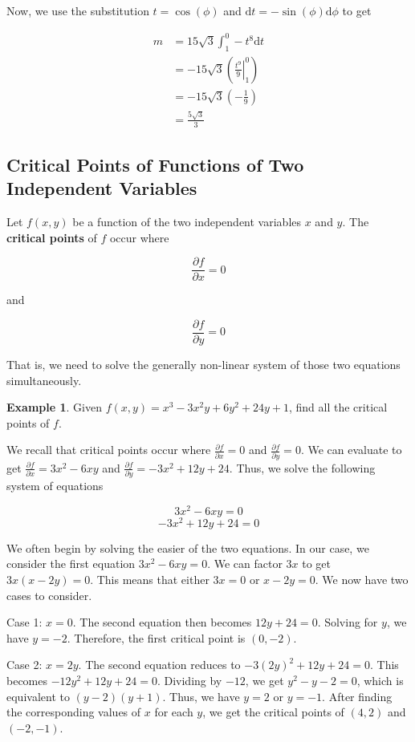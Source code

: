 \documentclass[11pt]{article}
\theoremstyle{plain} %
\theoremstyle{definition}
\theoremstyle{example}
\newtheorem*{example}{Example}
\theoremstyle{remark}
\begin{document}
Now, we use the substitution $t=\cos(\phi)$ and $\mathrm d t = - \sin(\phi)\mathrm d \phi$ to get

\begin{align*}
	m &= 15\sqrt{3}\int_1^0-t^8\mathrm d t\\
	&= -15\sqrt{3}\left(\left.\frac{t^9}{9}\right|_1^0\right)\\
	&= -15\sqrt{3}\left(-\frac{1}{9}\right)\\
	&= \frac{5\sqrt{3}}{3}
\end{align*}

\subsection{Critical Points of Functions of Two Independent Variables}

Let $f(x,y)$ be a function of the two independent variables $x$ and $y$. The \textbf{critical points} of $f$ occur where

$$\frac{\partial f}{\partial x} = 0$$ 

and

$$\frac{\partial f}{\partial y} = 0$$

That is, we need to solve the generally non-linear system of those two equations simultaneously. 

\begin{example}
Given $f(x,y) = x^3-3x^2y+6y^2+24y+1$, find all the critical points of $f$. 
\end{example}

We recall that critical points occur where $\frac{\partial f}{\partial x} = 0$ and $\frac{\partial f}{\partial y} = 0$. We can evaluate to get $\frac{\partial f}{\partial x} = 3x^2-6xy$ and $\frac{\partial f}{\partial y} = -3x^2+12y+24$. Thus, we solve the following system of equations

$$ 3x^2-6xy=0$$
$$-3x^2+12y+24=0$$

We often begin by solving the easier of the two equations. In our case, we consider the first equation $3x^2-6xy=0$. We can factor $3x$ to get $3x(x-2y)=0$. This means that either $3x=0$ or $x-2y=0$. We now have two cases to consider. 

Case 1: $x=0$. The second equation then becomes $12y+24=0$. Solving for $y$, we have $y=-2$. Therefore, the first critical point is $(0,-2)$.

Case 2: $x=2y$. The second equation reduces to $-3\left(2y\right)^2+12y+24 =0$. This becomes $-12y^2+12y+24=0$. Dividing by $-12$, we get $y^2-y-2=0$, which is equivalent to $(y-2)(y+1)$. Thus, we have $y=2$ or $y=-1$. After finding the corresponding values of $x$ for each $y$, we get the critical points of $(4,2)$ and $(-2, -1)$.
\end{document}
